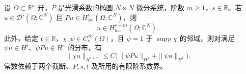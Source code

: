\begin{theorem}\label{g3:thm:elliptic-distribution-l2}
	设 \(\Omega\subset\mathbb R^n\) 开，\(P\) 是光滑系数的椭圆 \(N\times N\) 微分系统，阶数 \(m\ge1\)，\(s\in\mathbb R\)。若 \(u\in\mathcal D'(\Omega;\mathbb C^N)\) 且 \(Pu\in H^s_{\mathrm{loc}}(\Omega;\mathbb C^N)\)，则
	\[
		u\in H^{s+m}_{\mathrm{loc}}(\Omega;\mathbb C^N).
	\]
	此外，给定 \(t\in\mathbb R\)、\(\chi,\psi\in C_c^\infty(\Omega)\)，且 \(\psi=1\) 于 \(\operatorname{supp}\chi\) 的邻域，则对满足 \(\psi u\in H^t\)、\(\psi Pu\in H^s\) 的分布，有
	\begin{equation}\label{g3:eq:elliptic-distribution-estimate}
		\|\chi u\|_{H^{s+m}}
		\le C\bigl(\|\psi Pu\|_{H^s}+\|\psi u\|_{H^t}\bigr).
	\end{equation}
	常数依赖于两个截断、\(P,s,t\) 及所用的有限阶系数界。
\end{theorem}
